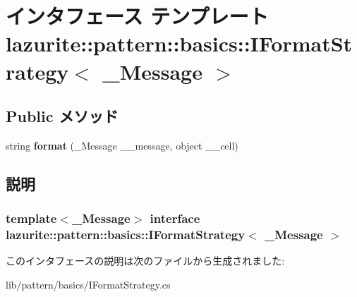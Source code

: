 \hypertarget{interfacelazurite_1_1pattern_1_1basics_1_1_i_format_strategy_3_01___message_01_4}{
\section{インタフェース テンプレート lazurite::pattern::basics::IFormatStrategy$<$ \_\-Message $>$}
\label{interfacelazurite_1_1pattern_1_1basics_1_1_i_format_strategy_3_01___message_01_4}
}
\subsection*{Public メソッド}
\begin{DoxyCompactItemize}
\item 
\hypertarget{interfacelazurite_1_1pattern_1_1basics_1_1_i_format_strategy_3_01___message_01_4_a439ed10da0bab5593bc0097dcac407ef}{
string {\bfseries format} (\_\-Message \_\-\_\-message, object \_\-\_\-cell)}
\label{interfacelazurite_1_1pattern_1_1basics_1_1_i_format_strategy_3_01___message_01_4_a439ed10da0bab5593bc0097dcac407ef}

\end{DoxyCompactItemize}


\subsection{説明}
\subsubsection*{template$<$\_\-Message$>$ interface lazurite::pattern::basics::IFormatStrategy$<$ \_\-Message $>$}



このインタフェースの説明は次のファイルから生成されました:\begin{DoxyCompactItemize}
\item 
lib/pattern/basics/IFormatStrategy.cs\end{DoxyCompactItemize}
